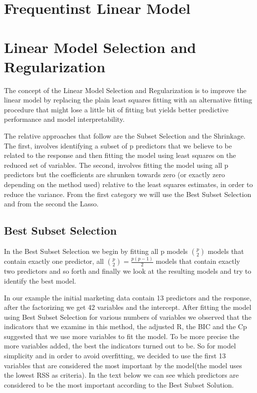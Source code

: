 \documentclass[11pt]{article}
\title{}
\author{}
\date{}
\begin{document}
\maketitle

\section{ Frequentinst Linear Model }



\section{Linear Model Selection and Regularization}  
The concept of the Linear Model Selection and Regularization is to improve the linear model by replacing the plain least squares fitting with an alternative fitting procedure that might lose a little bit of fitting but yields better predictive performance and model interpretability. 

The relative approaches that follow are the Subset Selection and the Shrinkage. The first, involves identifying a subset of p predictors that we believe to be related to the response and then fitting the model using least squares on the reduced set of variables. The second, involves fitting the model using all p predictors but the coefficients are shrunken towards zero (or exactly zero depending on the method used) relative to the least squares estimates, in order to reduce the variance. From the first category we will use the Best Subset Selection and from the second the Lasso.

\subsection{Best Subset Selection}

In the Best Subset Selection we begin by fitting all p models $\binom{p}{2}$ models that contain exactly one predictor, all $\binom{p}{2} =\frac{p(p-1)}2$ models that contain exactly two predictors and so forth and finally we look at the resulting models and try to identify the best model.

In our example the initial marketing data contain 13 predictors and the response, after the factorizing we get 42 variables and the intercept. After fitting the model using Best Subset Selection for various numbers of variables we observed that the indicators that we examine in this method, the adjusted R, the BIC and the Cp suggested that we use more variables to fit the model. To be more precise the more variables added, the best the indicators turned out to be. So for model simplicity and in order to avoid overfitting, we decided to use the first 13 variables that are considered the most important by the model(the model uses the lowest RSS as criteria). In the text below we can see which predictors are considered to be the most important according to the Best Subset Solution.
\end{document}
